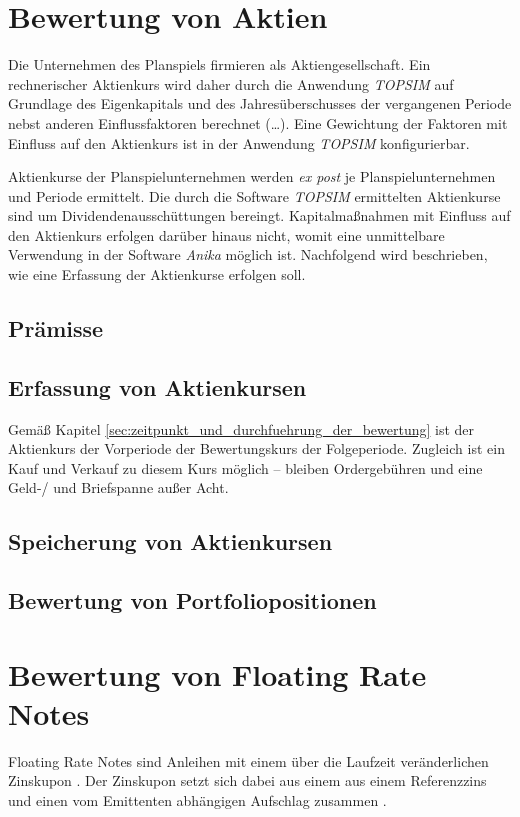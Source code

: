 \documentclass[12pt, a4paper]{article}
\begin{document}
\section{Bewertung von Aktien}
\label{sec:bewertung_von_aktien}
Die Unternehmen des Planspiels firmieren als Aktiengesellschaft.
Ein rechnerischer Aktienkurs wird daher durch die Anwendung \textit{TOPSIM} auf Grundlage des Eigenkapitals und des Jahresüberschusses der vergangenen Periode nebst anderen Einflussfaktoren berechnet (\dots). 
Eine Gewichtung der Faktoren mit Einfluss auf den Aktienkurs ist in der Anwendung \textit{TOPSIM} konfigurierbar. 

Aktienkurse der Planspielunternehmen werden \textit{ex post} je Planspielunternehmen und Periode ermittelt. Die durch die Software \textit{TOPSIM} ermittelten Aktienkurse sind um Dividendenausschüttungen bereingt. Kapitalmaßnahmen mit Einfluss auf den Aktienkurs erfolgen darüber hinaus nicht, womit eine unmittelbare Verwendung in der Software \textit{Anika} möglich ist. Nachfolgend wird beschrieben, wie eine Erfassung der Aktienkurse erfolgen soll.

\subsection{Prämisse}

\subsection{Erfassung von Aktienkursen}


Gemäß Kapitel \ref{sec:zeitpunkt_und_durchfuehrung_der_bewertung} ist der Aktienkurs der Vorperiode der Bewertungskurs der Folgeperiode.
Zugleich ist ein Kauf und Verkauf zu diesem Kurs möglich -- bleiben Ordergebühren und eine Geld-/ und Briefspanne außer Acht. 

\subsection{Speicherung von Aktienkursen}

\subsection{Bewertung von Portfoliopositionen}





\section{Bewertung von Floating Rate Notes}
\label{sec:bewertung_von_floating_rate_notes}
Floating Rate Notes sind Anleihen mit einem über die Laufzeit veränderlichen Zinskupon \autocite[][373]{fabozzi_handbook_2005}. Der Zinskupon setzt sich dabei aus einem aus einem Referenzzins und einen vom Emittenten abhängigen Aufschlag zusammen \autocite[][374]{fabozzi_handbook_2005}.
\end{document}
